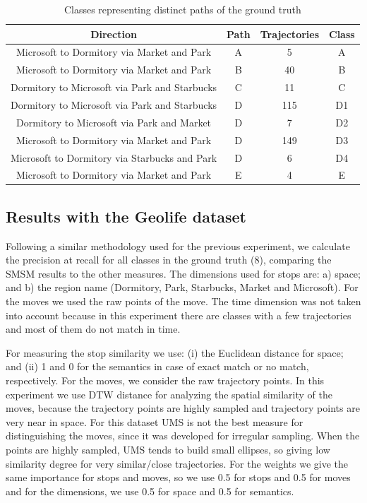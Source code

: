 \begin{table}[ht!]
\scriptsize
  \centering
  \begin{tabular}{|c|c|c|c|}
  \hline
 Direction & Path &  Trajectories & Class \\
  \hline
Microsoft to Dormitory via Market and Park& A & 5 & A \\
Microsoft to Dormitory via Market and Park& B & 40&B \\
Dormitory to Microsoft via Park and Starbucks& C & 11&C \\
Dormitory to Microsoft via Park and Starbucks& D & 115&D1 \\
Dormitory to Microsoft via Park and Market& D & 7&D2 \\
Microsoft to Dormitory via Market and Park& D & 149&D3 \\
Microsoft to Dormitory via Starbucks and Park& D & 6&D4 \\
Microsoft to Dormitory via Market and Park& E & 4& E \\
    \hline
  \end{tabular}
  \caption{Classes representing distinct paths of the ground truth}
  \label{tab:geolife_dataset}
\end{table}

\subsection{Results with the Geolife dataset}

Following a similar methodology used for the previous experiment, we calculate the precision at recall for all classes in the ground truth (8), comparing the SMSM results to the other measures. The dimensions used for stops are: a) space; and b) the region name (Dormitory, Park, Starbucks, Market and Microsoft). For the moves we used the raw points of the move. The time dimension was not taken into account because in this experiment there are classes with a few trajectories and most of them do not match in time.

For measuring the stop similarity we use: (i) the Euclidean distance for space; and (ii) 1 and 0 for the semantics in case of exact match or no match, respectively. For the moves,  we consider the raw trajectory points. In this experiment we use DTW distance for analyzing the spatial similarity of the moves, because the trajectory points are highly sampled {and trajectory points are very near in space}.
For this dataset UMS is not the best measure for distinguishing the moves, since it was developed for irregular sampling. {When the points are highly sampled, UMS tends to build small ellipses, so giving low similarity degree for very similar/close trajectories}. For the weights we give the same importance for stops and moves, so we use 0.5 for stops and 0.5 for moves and for the dimensions, we use 0.5 for space and 0.5 for semantics.

